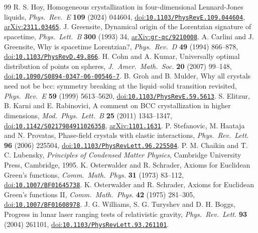 \documentclass[a4paper,11pt]{article}
\numberwithin{equation}{section}
\theoremstyle{jsplain}
\theoremstyle{jsrem}
\begin{document}
\begin{thebibliography}{99}
 R. S. Hoy, Homogeneous crystallization in four-dimensional Lennard-Jones liquids, \textit{Phys.\ Rev.\ E} \textbf{109} (2024) 044604, \href{https://doi.org/10.1103/PhysRevE.109.044604}{doi:\nolinkurl{10.1103/PhysRevE.109.044604}}, \href{https://arxiv.org/abs/2311.03465}{arXiv:\nolinkurl{2311.03465}}.
 J. Greensite, Dynamical origin of the Lorentzian signature of spacetime, \textit{Phys.\ Lett.\ B} \textbf{300} (1993) 34, \href{https://arxiv.org/abs/gr-qc/9210008}{arXiv:\nolinkurl{gr-qc/9210008}}.
 A. Carlini and J. Greensite, Why is spacetime Lorentzian?, \textit{Phys.\ Rev.\ D} \textbf{49} (1994) 866--878, \href{https://doi.org/10.1103/PhysRevD.49.866}{doi:\nolinkurl{10.1103/PhysRevD.49.866}}.
 H. Cohn and A. Kumar, Universally optimal distribution of points on spheres, \textit{J.\ Amer.\ Math.\ Soc.} \textbf{20} (2007) 99--148, \href{https://doi.org/10.1090/S0894-0347-06-00546-7}{doi:\nolinkurl{10.1090/S0894-0347-06-00546-7}}.
 B. Groh and B. Mulder, Why all crystals need not be bcc: symmetry breaking at the liquid--solid transition revisited, \textit{Phys.\ Rev.\ E} \textbf{59} (1999) 5613--5620, \href{https://doi.org/10.1103/PhysRevE.59.5613}{doi:\nolinkurl{10.1103/PhysRevE.59.5613}}.
 S. Elitzur, B. Karni and E. Rabinovici, A comment on BCC crystallization in higher dimensions, \textit{Mod.\ Phys.\ Lett.\ B} \textbf{25} (2011) 1343--1347, \href{https://doi.org/10.1142/S0217984911026358}{doi:\nolinkurl{10.1142/S0217984911026358}}, \href{https://arxiv.org/abs/1101.1631}{arXiv:\nolinkurl{1101.1631}}.
 P. Stefanovic, M. Haataja and N. Provatas, Phase-field crystals with elastic interactions, \textit{Phys.\ Rev.\ Lett.} \textbf{96} (2006) 225504, \href{https://doi.org/10.1103/PhysRevLett.96.225504}{doi:\nolinkurl{10.1103/PhysRevLett.96.225504}}.
 P. M. Chaikin and T. C. Lubensky, \textit{Principles of Condensed Matter Physics}, Cambridge University Press, Cambridge, 1995.
 K. Osterwalder and R. Schrader, Axioms for Euclidean Green's functions, \textit{Comm.\ Math.\ Phys.} \textbf{31} (1973) 83--112, \href{https://doi.org/10.1007/BF01645738}{doi:\nolinkurl{10.1007/BF01645738}}.
 K. Osterwalder and R. Schrader, Axioms for Euclidean Green's functions II, \textit{Comm.\ Math.\ Phys.} \textbf{42} (1975) 281--305, \href{https://doi.org/10.1007/BF01608978}{doi:\nolinkurl{10.1007/BF01608978}}.
 J. G. Williams, S. G. Turyshev and D. H. Boggs, Progress in lunar laser ranging tests of relativistic gravity, \textit{Phys.\ Rev.\ Lett.} \textbf{93} (2004) 261101, \href{https://doi.org/10.1103/PhysRevLett.93.261101}{doi:\nolinkurl{10.1103/PhysRevLett.93.261101}}.
\end{thebibliography}
\end{document}
